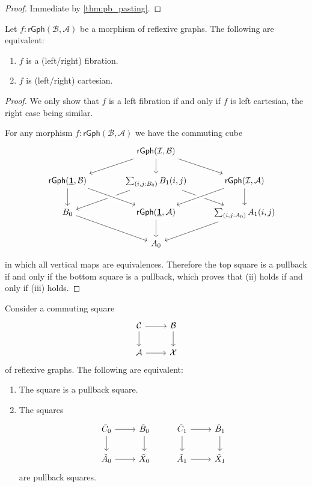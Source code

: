\begin{proof}
Immediate by \cref{thm:pb_pasting}.
\end{proof}

\begin{prp}\label{prp:fib_cart}
Let $f:\mathsf{rGph}(\mathcal{B},\mathcal{A})$ be a morphism of reflexive graphs. The following are equivalent:
\begin{enumerate}
\item $f$ is a (left/right) fibration.
\item $f$ is (left/right) cartesian.
\end{enumerate}
\end{prp}

\begin{proof}
We only show that $f$ is a left fibration if and only if $f$ is left cartesian, the right case being similar.

For any morphism $f:\mathsf{rGph}(\mathcal{B},\mathcal{A})$ we have the commuting cube
\begin{equation*}
\begin{tikzcd}
& \mathsf{rGph}(\mathcal{I},\mathcal{B}) \arrow[dl] \arrow[d] \arrow[dr] \\
\mathsf{rGph}(\unit,\mathcal{B}) \arrow[d] & \sm{i,j:\pts{B}}\edg{B}(i,j) \arrow[dl] \arrow[dr] & \mathsf{rGph}(\mathcal{I},\mathcal{A}) \arrow[dl,crossing over] \arrow[d] \\
\pts{B} \arrow[dr] & \mathsf{rGph}(\unit,\mathcal{A}) \arrow[d] \arrow[from=ul,crossing over] & \sm{i,j:\pts{A}}\edg{A}(i,j) \arrow[dl] \\
\phantom{\sm{i,j:\pts{A}}\edg{A}(i,j)} & \pts{A}
\end{tikzcd}
\end{equation*}
in which all vertical maps are equivalences. Therefore the top square is a pullback if and only if the bottom square is a pullback, which proves that (ii) holds if and only if (iii) holds.
\end{proof}

\begin{prp}
Consider a commuting square
\begin{equation*}
\begin{tikzcd}
\mathcal{C} \arrow[r] \arrow[d] & \mathcal{B} \arrow[d] \\
\mathcal{A} \arrow[r] & \mathcal{X}
\end{tikzcd}
\end{equation*}
of reflexive graphs. The following are equivalent:
\begin{enumerate}
\item The square is a pullback square.
\item The squares
\begin{equation*}
\begin{tikzcd}
\tilde{C}_0 \arrow[r] \arrow[d] & \tilde{B}_0 \arrow[d] & \tilde{C}_1 \arrow[r] \arrow[d] & \tilde{B}_1 \arrow[d] \\
\tilde{A}_0 \arrow[r] & \tilde{X}_0 & \tilde{A}_1 \arrow[r] & \tilde{X}_1
\end{tikzcd}
\end{equation*}
are pullback squares.
\end{enumerate}
\end{prp}

